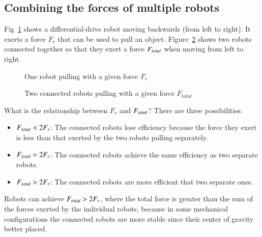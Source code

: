 \subsection{Combining the forces of multiple robots}

Fig~\ref{fig.pulling1} shows a differential-drive robot moving backwards (from left to right). It exerts a force $F_r$ that can be used to pull an object. Figure~\ref{fig.pulling2} shows two robots connected together so that they exert a force $F_{\textit{\scriptsize total}}$ when moving from left to right.

\begin{figure}
\begin{center}
\caption{One robot pulling with a given force $F_r$}\label{fig.pulling1}
\end{center}
\end{figure}

\begin{figure}
\begin{center}
\caption{Two connected robots pulling with a given force $F_{total}$}\label{fig.pulling2}
\end{center}
\end{figure}

What is the relationship between $F_r$ and $F_{\textit{\scriptsize total}}$? There are three possibilities:
\begin{itemize}
\item $F_{\textit{\scriptsize total}} < 2 F_r$: The connected robots lose efficiency because the force they exert is less than that exerted by the two robots pulling separately.
\item $F_{\textit{\scriptsize total}} = 2 F_r$: The connected robots achieve the same efficiency as two separate robots.
\item $F_{\textit{\scriptsize total}} > 2 F_r$: The connected robots are more efficient that two separate ones.
\end{itemize}
Robots can achieve $F_{\textit{\scriptsize total}} > 2 F_r$, where the total force is greater than the sum of the forces exerted by the individual robots, because in some mechanical configurations the connected robots are more stable since their center of gravity better placed. 

